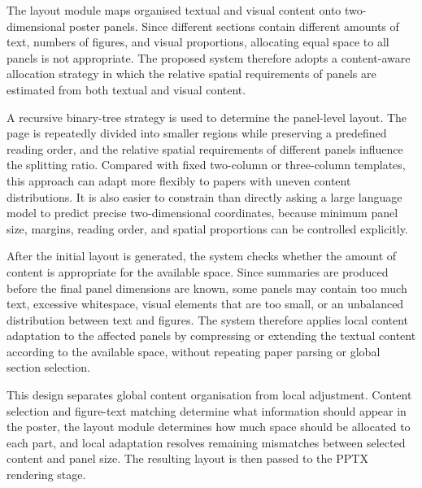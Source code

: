 \documentclass[12pt,oneside]{report}
\begin{document}
The layout module maps organised textual and visual content onto two-dimensional poster panels. Since different sections contain different amounts of text, numbers of figures, and visual proportions, allocating equal space to all panels is not appropriate. The proposed system therefore adopts a content-aware allocation strategy in which the relative spatial requirements of panels are estimated from both textual and visual content.

\vspace{1em}

A recursive binary-tree strategy is used to determine the panel-level layout. The page is repeatedly divided into smaller regions while preserving a predefined reading order, and the relative spatial requirements of different panels influence the splitting ratio. Compared with fixed two-column or three-column templates, this approach can adapt more flexibly to papers with uneven content distributions. It is also easier to constrain than directly asking a large language model to predict precise two-dimensional coordinates, because minimum panel size, margins, reading order, and spatial proportions can be controlled explicitly.

\vspace{1em}

After the initial layout is generated, the system checks whether the amount of content is appropriate for the available space. Since summaries are produced before the final panel dimensions are known, some panels may contain too much text, excessive whitespace, visual elements that are too small, or an unbalanced distribution between text and figures. The system therefore applies local content adaptation to the affected panels by compressing or extending the textual content according to the available space, without repeating paper parsing or global section selection.

\vspace{1em}

This design separates global content organisation from local adjustment. Content selection and figure-text matching determine what information should appear in the poster, the layout module determines how much space should be allocated to each part, and local adaptation resolves remaining mismatches between selected content and panel size. The resulting layout is then passed to the PPTX rendering stage.

\end{document}
